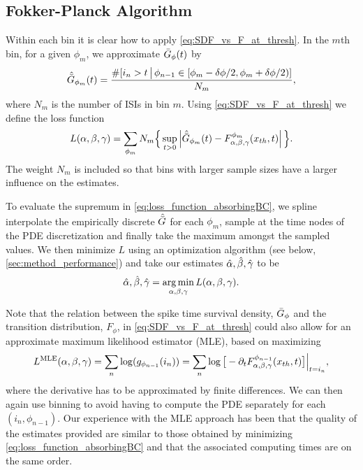 \subsection{Fokker-Planck Algorithm}
Within each bin it is clear how to apply \cref{eq:SDF_vs_F_at_thresh}. In the
$m$th bin, for a given $\phi_m$, we approximate ${ \bar{G} }_{\phi}(t)$  by
\begin{equation}
{ \hat{{ \bar{G} }} }_{\phi_m}(t) =
 \frac{\#[i_n > t \, \big| \, \phi_{n-1} \in [\phi_m - { \delta \phi }/2,
\phi_m + { \delta \phi }/2) ]}{N_m},
\label{eq:SDF_estimate_per_bin}
\end{equation}
where $N_m$ is the number of ISIs in bin $m$. Using \cref{eq:SDF_vs_F_at_thresh}
we define the loss function
\begin{equation}
L(\alpha,\beta,{\gamma }) = 
\sum_{\phi_m} N_m \Big\{ 
\sup_{t>0} \left| { \hat{{ \bar{G} }} }_{\phi_m}(t) - F^{\phi_m}_{\alpha,\beta,{\gamma }}({ x_{th} },
t) \right| \Big \}.
\label{eq:loss_function_absorbingBC}
\end{equation}
The weight $N_m$ is included so that bins with larger sample sizes have a
larger influence on the estimates. 
 
To evaluate the supremum in \cref{eq:loss_function_absorbingBC}, we
spline interpolate the empirically discrete ${ \hat{{ \bar{G} }} }$ for each $\phi_m$, sample at
the time nodes of the PDE discretization and 
finally take the maximum amongst the sampled values.
We then minimize $L$ using an optimization algorithm (see below,
\cref{sec:method_performance}) and take our estimates ${{{ \hat{\alpha} }, { \hat{\beta} }, { \hat{{\gamma }} }} }$ to be
$$
\abgest = \argmin_{\abg} L(\abg).
$$

Note that the relation between the spike time survival density, ${ \bar{G} }_{\phi}$ and
the transition distribution, $F_{\phi}$, in \cref{eq:SDF_vs_F_at_thresh} could
also allow for an approximate maximum likelihood estimator (MLE), based on
maximizing 
$$
L^{\textrm{MLE}}(\alpha,\beta,{\gamma }) = \sum_n  \log ( g_{\phi_{n-1}}(i_n) )
= \sum_n \log \big[ -{\partial}_t F^{\phi_{n-1}}_{\alpha,\beta,{\gamma }}({ x_{th} }, t) \big] \Big|_{t =
i_n},
 $$ where the derivative has to be approximated by finite differences. We
can then again use binning to avoid having to compute the PDE separately for
each $(i_n, \phi_{n-1})$. Our experience with the MLE approach has been that the
quality of the estimates provided are similar to those obtained by minimizing
\cref{eq:loss_function_absorbingBC} and that the associated computing times are
on the same order.  
